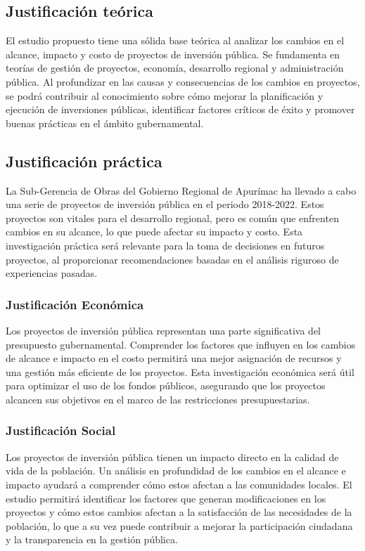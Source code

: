 \subsection{Justificación teórica}

El estudio propuesto tiene una sólida base teórica al analizar los cambios en el alcance, impacto y costo de proyectos de inversión pública. Se fundamenta en teorías de gestión de proyectos, economía, desarrollo regional y administración pública. Al profundizar en las causas y consecuencias de los cambios en proyectos, se podrá contribuir al conocimiento sobre cómo mejorar la planificación y ejecución de inversiones públicas, identificar factores críticos de éxito y promover buenas prácticas en el ámbito gubernamental.

\subsection{Justificación práctica}

La Sub-Gerencia de Obras del Gobierno Regional de Apurímac ha llevado a cabo una serie de proyectos de inversión pública en el periodo 2018-2022. Estos proyectos son vitales para el desarrollo regional, pero es común que enfrenten cambios en su alcance, lo que puede afectar su impacto y costo. Esta investigación práctica será relevante para la toma de decisiones en futuros proyectos, al proporcionar recomendaciones basadas en el análisis riguroso de experiencias pasadas.

\subsubsection{Justificación Económica}

Los proyectos de inversión pública representan una parte significativa del presupuesto gubernamental. Comprender los factores que influyen en los cambios de alcance e impacto en el costo permitirá una mejor asignación de recursos y una gestión más eficiente de los proyectos. Esta investigación económica será útil para optimizar el uso de los fondos públicos, asegurando que los proyectos alcancen sus objetivos en el marco de las restricciones presupuestarias.

\subsubsection{Justificación Social}
Los proyectos de inversión pública tienen un impacto directo en la calidad de vida de la población. Un análisis en profundidad de los cambios en el alcance e impacto ayudará a comprender cómo estos afectan a las comunidades locales. El estudio permitirá identificar los factores que generan modificaciones en los proyectos y cómo estos cambios afectan a la satisfacción de las necesidades de la población, lo que a su vez puede contribuir a mejorar la participación ciudadana y la transparencia en la gestión pública.

